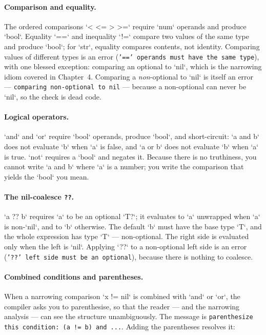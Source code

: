 \paragraph{Comparison and equality.} The ordered comparisons `< <= > >=`
require `num` operands and produce `bool`. Equality `==` and inequality `!=`
compare two values of the same type and produce `bool`; for `str`, equality
compares contents, not identity. Comparing values of different types is an
error (\texttt{'==' operands must have the same type}), with one blessed
exception: comparing an optional to `nil`, which is the narrowing idiom
covered in Chapter~4. Comparing a \emph{non}-optional to `nil` is itself an
error --- \texttt{comparing non-optional to nil} --- because a non-optional can
never be `nil`, so the check is dead code.

\paragraph{Logical operators.} `and` and `or` require `bool` operands, produce
`bool`, and short-circuit: `a and b` does not evaluate `b` when `a` is false,
and `a or b` does not evaluate `b` when `a` is true. `not` requires a `bool`
and negates it. Because there is no truthiness, you cannot write `a and b`
where `a` is a number; you write the comparison that yields the `bool` you
mean.

\paragraph{The nil-coalesce \texttt{??}.} `a ?? b` requires `a` to be an
optional `T?`; it evaluates to `a` unwrapped when `a` is non-`nil`, and to `b`
otherwise. The default `b` must have the base type `T`, and the whole
expression has type `T` --- non-optional. The right side is evaluated only when
the left is `nil`. Applying `??` to a non-optional left side is an error
(\texttt{'??' left side must be an optional}), because there is nothing to
coalesce.

\paragraph{Combined conditions and parentheses.} When a narrowing comparison
`x != nil` is combined with `and` or `or`, the compiler asks you to
parenthesise, so that the reader --- and the narrowing analysis --- can see the
structure unambiguously. The message is
\texttt{parenthesize this condition: (a != b) and ...}. Adding the parentheses
resolves it:

